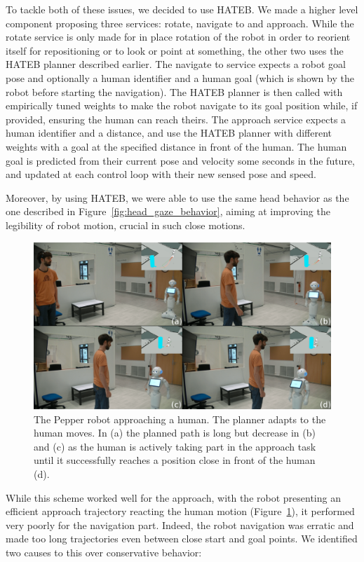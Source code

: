 \documentclass[a4paper,11pt,twoside]{StyleThese}
\begin{document}
To tackle both of these issues, we decided to use HATEB. We made a higher level component proposing three services: rotate, navigate to and approach. While the rotate service is only made for in place rotation of the robot in order to reorient itself for repositioning or to look or point at something, the other two uses the HATEB planner described earlier. The navigate to service expects a robot goal pose and optionally a human identifier and a human goal (which is shown by the robot before starting the navigation). The HATEB planner is then called with empirically tuned weights to make the robot navigate to its goal position while, if provided, ensuring the human can reach theirs. The approach service expects a human identifier and a distance, and use the HATEB planner with different weights with a goal at the specified distance in front of the human. The human goal is predicted from their current pose and velocity some seconds in the future, and updated at each control loop with their new sensed pose and speed.

Moreover, by using HATEB, we were able to use the same head behavior as the one described in Figure~\ref{fig:head_gaze_behavior}, aiming at improving the legibility of robot motion, crucial in such close motions.

\begin{figure}[hbtp]
\centering
\includegraphics[width=\textwidth]{figures/chapter2/approach.png}
\caption{The Pepper robot approaching a human. The planner adapts to the human moves. In (a) the planned path is long but decrease in (b) and (c) as the human is actively taking part in the approach task until it successfully reaches a position close in front of the human (d).}
\label{fig:approach}
\end{figure}


While this scheme worked well for the approach, with the robot presenting an efficient approach trajectory reacting the human motion (Figure~\ref{fig:approach}), it performed very poorly for the navigation part. Indeed, the robot navigation was erratic and made too long trajectories even between close start and goal points. We identified two causes to this over conservative behavior:
\end{document}
